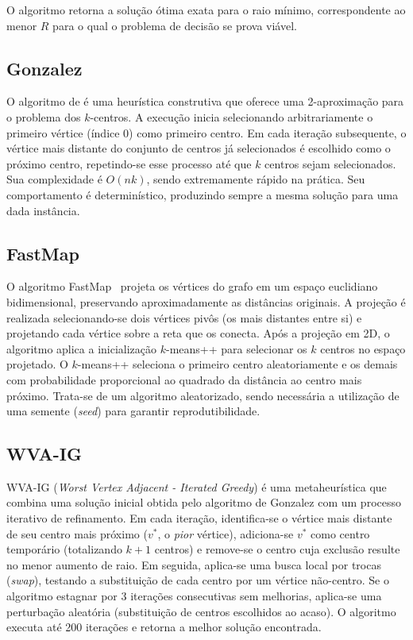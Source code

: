 \documentclass[12pt]{article}
\begin{document}
O algoritmo retorna a solução ótima exata para o raio mínimo, correspondente ao menor $R$ para o qual o problema de decisão se prova viável.

\subsection{Gonzalez} \label{gonzalez}

O algoritmo de \cite{gonzalez1985} é uma heurística construtiva que oferece uma 2-aproximação para o problema dos $k$-centros. A execução inicia selecionando arbitrariamente o primeiro vértice (índice 0) como primeiro centro. Em cada iteração subsequente, o vértice mais distante do conjunto de centros já selecionados é escolhido como o próximo centro, repetindo-se esse processo até que $k$ centros sejam selecionados. Sua complexidade é $O(nk)$, sendo extremamente rápido na prática. Seu comportamento é determinístico, produzindo sempre a mesma solução para uma dada instância.

\subsection{FastMap} \label{fast-map}

O algoritmo FastMap~\cite{faloutsos1995} projeta os vértices do grafo em um espaço euclidiano bidimensional, preservando aproximadamente as distâncias originais. A projeção é realizada selecionando-se dois vértices pivôs (os mais distantes entre si) e projetando cada vértice sobre a reta que os conecta. Após a projeção em 2D, o algoritmo aplica a inicialização $k$-means++ para selecionar os $k$ centros no espaço projetado. O $k$-means++ seleciona o primeiro centro aleatoriamente e os demais com probabilidade proporcional ao quadrado da distância ao centro mais próximo. Trata-se de um algoritmo aleatorizado, sendo necessária a utilização de uma semente (\textit{seed}) para garantir reprodutibilidade.

\subsection{WVA-IG} \label{wva-ig}

WVA-IG (\textit{Worst Vertex Adjacent - Iterated Greedy}) é uma metaheurística que combina uma solução inicial obtida pelo algoritmo de Gonzalez com um processo iterativo de refinamento. Em cada iteração, identifica-se o vértice mais distante de seu centro mais próximo ($v^*$, o \textit{pior} vértice), adiciona-se $v^*$ como centro temporário (totalizando $k+1$ centros) e remove-se o centro cuja exclusão resulte no menor aumento de raio. Em seguida, aplica-se uma busca local por trocas (\textit{swap}), testando a substituição de cada centro por um vértice não-centro. Se o algoritmo estagnar por 3 iterações consecutivas sem melhorias, aplica-se uma perturbação aleatória (substituição de centros escolhidos ao acaso). O algoritmo executa até 200 iterações e retorna a melhor solução encontrada.
\end{document}
